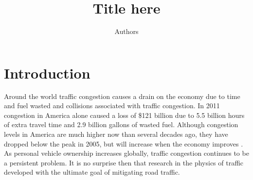 \documentclass[preprint]{elsarticle}
\begin{document}
\begin{frontmatter}

\title{Title here}

\author[add]{Authors}
\address[add]{address}
%
%
%

\begin{abstract}

\end{abstract}

\begin{keyword}

\end{keyword}

\end{frontmatter}


\section{Introduction}



Around the world traffic congestion causes a drain on the economy due to time and fuel wasted and collisions associated with traffic congestion. In 2011 congestion in America alone caused a loss of \$121 billion due to 5.5 billion hours of extra travel time and 2.9 billion gallons of wasted fuel. Although congestion levels in America are much higher now than several decades ago, they have dropped below the peak in 2005, but will increase when the economy improves \cite{Texas}. As personal vehicle ownership increases globally, traffic congestion continues to be a persistent problem. It is no surprise then that research in the physics of traffic developed with the ultimate goal of mitigating road traffic.
\end{document}
